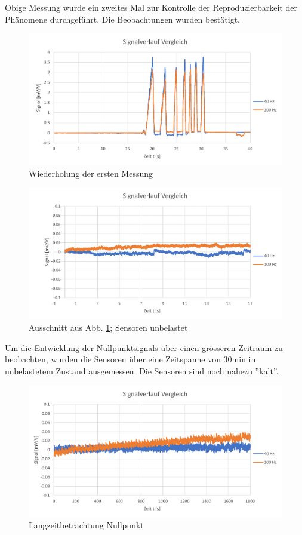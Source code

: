 Obige Messung wurde ein zweites Mal zur Kontrolle der Reproduzierbarkeit der Phänomene durchgeführt. Die Beobachtungen wurden bestätigt.
\begin{figure}[H]
	\centering
	\includegraphics[width=1\linewidth]{imgs/daten_002}
	\caption{Wiederholung der ersten Messung}
	\label{fig:daten002}
\end{figure}
\begin{figure}[H]
	\centering
	\includegraphics[width=1\linewidth]{imgs/daten_002_NP}
	\caption{Ausschnitt aus Abb. \ref{fig:daten002}; Sensoren unbelastet}
	\label{fig:daten002_NP}
\end{figure}\noindent
Um die Entwicklung der Nullpunktsignals über einen grösseren Zeitraum zu beobachten, wurden die Sensoren über eine Zeitspanne von 30min in unbelastetem Zustand ausgemessen. Die Sensoren sind noch nahezu ''kalt''.
\begin{figure}[H]
	\centering
	\includegraphics[width=1\linewidth]{imgs/daten_003_kpl}
	\caption{Langzeitbetrachtung Nullpunkt}
	\label{fig:daten003kpl}
\end{figure}
